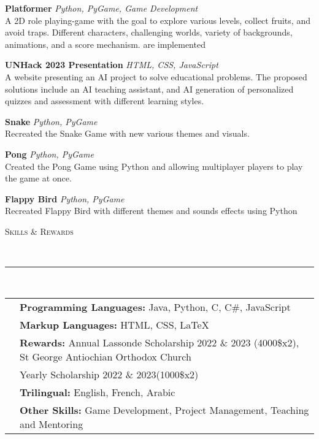 \documentclass[a4paper]{article}
\newcommand{\lineunder}{
	\vspace*{-8pt} \\
	\hspace*{-18pt} \renewcommand{\hrulefill}{\rule{1.025\textwidth}{1.5pt}} \hrulefill \\
}
\newcommand{\header} [1] {
	{\hspace*{-18pt}\vspace*{6pt} \textsc{#1}}
	\vspace*{-6pt} 
	\lineunder
}
\begin{document}
	{\textbf{Platformer \textbar{}}} {\sl Python, PyGame, Game Development} \\
	A 2D role playing-game with the goal to explore various levels, collect fruits, and avoid traps. Different characters, challenging worlds, variety of backgrounds, animations, and a score mechanism. are implemented\\
	\vspace*{2mm}

	{\textbf{UNHack 2023 Presentation \textbar{}}} {\sl HTML, CSS, JavaScript} \\
	A website presenting an AI project to solve educational problems. The proposed solutions include an AI teaching assistant, and AI generation of personalized quizzes and assessment with different learning styles.\\
	\vspace*{2mm}

	{\textbf{Snake \textbar{}}} {\sl Python, PyGame} \\
	Recreated the Snake Game with new various themes and visuals.\\
	\vspace*{2mm}

	{\textbf{Pong \textbar{}}} {\sl Python, PyGame} \\
	Created the Pong Game using Python and allowing multiplayer players to play the game at once.\\
	\vspace*{2mm}

	{\textbf{Flappy Bird \textbar{}}} {\sl Python, PyGame} \\
	Recreated Flappy Bird with different themes and sounds effects using Python\\
	\vspace*{2mm}
	
	\header{Skills \& Rewards}
	\begin{tabular}{ l l }
		\vspace{1mm}
		&\textbf{Programming Languages:} Java, Python, C, C\#, JavaScript \\
		\vspace{1mm}
		&\textbf{Markup Languages:} HTML, CSS, LaTeX \\
		&\textbf{Rewards:} Annual Lassonde Scholarship 2022 \& 2023 (4000\$x2), St George Antiochian Orthodox Church \\
		\vspace{1mm}
		&\hspace{16.5mm} Yearly Scholarship 2022 \& 2023(1000\$x2)\\
		\vspace{1mm}
		&\textbf{Trilingual:} English, French, Arabic \\
		&\textbf{Other Skills:} Game Development, Project Management, Teaching and Mentoring \\
	\end{tabular}
	\vspace{2mm}
	
\end{document}
